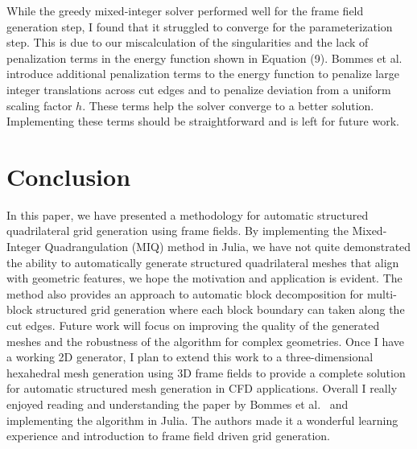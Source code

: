 \documentclass[12pt, letterpaper]{article}
\begin{document}
While the greedy mixed-integer solver performed well for the frame field generation step, I found that it struggled to converge for the parameterization step. This is due to our miscalculation of the singularities and the lack of penalization terms in the energy function shown in Equation (9). Bommes et al.~\cite{bommes2009mixed} introduce additional penalization terms to the energy function to penalize large integer translations across cut edges and to penalize deviation from a uniform scaling factor $h$. These terms help the solver converge to a better solution. Implementing these terms should be straightforward and is left for future work.

\section{Conclusion}
In this paper, we have presented a methodology for automatic structured quadrilateral grid generation using frame fields. By implementing the Mixed-Integer Quadrangulation (MIQ) method in Julia, we have not quite demonstrated the ability to automatically generate structured quadrilateral meshes that align with geometric features, we hope the motivation and application is evident. The method also provides an approach to automatic block decomposition for multi-block structured grid generation where each block boundary can taken along the cut edges. Future work will focus on improving the quality of the generated meshes and the robustness of the algorithm for complex geometries. Once I have a working 2D generator, I plan to extend this work to a three-dimensional hexahedral mesh generation using 3D frame fields to provide a complete solution for automatic structured mesh generation in CFD applications. Overall I really enjoyed reading and understanding the paper by Bommes et al.~\cite{bommes2009mixed} and implementing the algorithm in Julia. The authors made it a wonderful learning experience and introduction to frame field driven grid generation.
\end{document}
